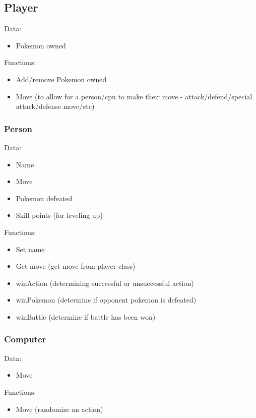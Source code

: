 \documentclass{article}
\begin{document}
  \begin{multicols}{2}
    \subsection{Player}
    Data: 
    \begin{itemize}
      \item Pokemon owned
    \end{itemize}
    Functions:
    \begin{itemize}
      \item Add/remove Pokemon owned
      \item Move (to allow for a person/cpu to make their move - attack/defend/special attack/defense move/etc)
    \end{itemize}
    
    \subsubsection{Person}
    Data:
    \begin{itemize}
      \item Name
      \item Move
      \item Pokemon defeated
      \item Skill points (for leveling up)
    \end{itemize}
    Functions:
    \begin{itemize}
      \item Set name
      \item Get move (get move from player class)
      \item winAction (determining successful or unsuccessful action)
      \item winPokemon (determine if opponent pokemon is defeated)
      \item winBattle (determine if battle has been won)
    \end{itemize}
    
    \subsubsection{Computer}
    Data:
    \begin{itemize}
      \item Move
    \end{itemize}
    Functions:
    \begin{itemize}
      \item Move (randomize an action)
    \end{itemize}
      

\end{multicols}
\end{document}
